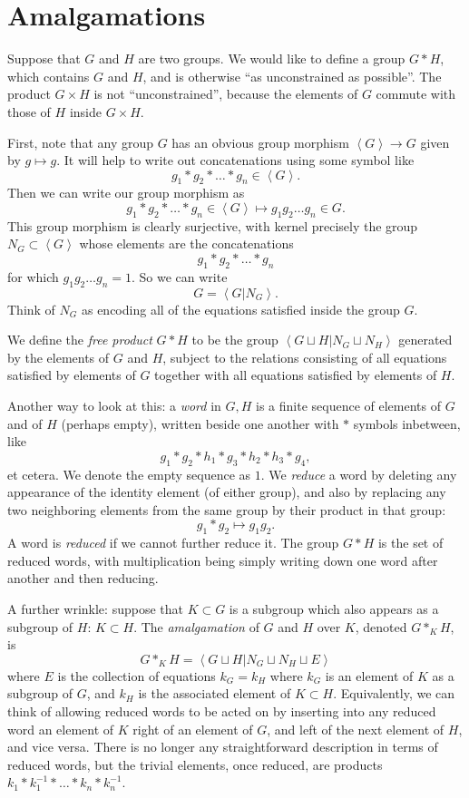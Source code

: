 \section{Amalgamations}
Suppose that \(G\) and \(H\) are two groups.
We would like to define a group \(G*H\), which contains \(G\) and \(H\), and is otherwise ``as unconstrained as possible''.
The product \(G \times H\) is not ``unconstrained'', because the elements of \(G\) commute with those of \(H\) inside \(G \times H\).

First, note that any group \(G\) has an obvious group morphism \(\left<G\right> \to G\) given by \(g \mapsto g\).
It will help to write out concatenations using some symbol like
\[
g_1 * g_2 * \dots * g_n \in \left<G\right>.
\]
Then we can write our group morphism as
\[
g_1 * g_2 * \dots * g_n \in \left<G\right> \mapsto g_1 g_2 \dots g_n \in G.
\]
This group morphism is clearly surjective, with kernel precisely the group \(N_G \subset \left<G\right>\) whose elements are the concatenations
\[
g_1 * g_2 * \dots * g_n
\]
for which \(g_1 g_2 \dots g_n=1\).
So we can write
\[
G=\left<G|N_G\right>.
\]
Think of \(N_G\) as encoding all of the equations satisfied inside the group \(G\).

We define the \emph{free product} \(G*H\) to be the group \(\left<G \sqcup H|N_G \sqcup N_H\right>\) generated by the elements of \(G\) and \(H\), subject to the relations consisting of all equations satisfied by elements of \(G\) together with all equations satisfied by elements of \(H\).

Another way to look at this: a \emph{word} in \(G,H\) is a finite sequence of elements of \(G\) and of \(H\) (perhaps empty), written beside one another with \(*\) symbols inbetween, like
\[
g_1 * g_2 * h_1 * g_3 * h_2 * h_3 * g_4,
\]
et cetera.
We denote the empty sequence as \(1\).
We \emph{reduce} a word by deleting any appearance of the identity element (of either group), and also by replacing any two neighboring elements from the same group by their product in that group:
\[
g_1 * g_2 \mapsto g_1 g_2.
\]
A word is \emph{reduced} if we cannot further reduce it.
The group \(G*H\) is the set of reduced words, with multiplication being simply writing down one word after another and then reducing.

A further wrinkle: suppose that \(K \subset G\) is a subgroup which also appears as a subgroup of \(H\): \(K \subset H\).
The \emph{amalgamation} of \(G\) and \(H\) over \(K\), denoted \(G*_K H\), is
\[
G *_K H = \left<G \sqcup H|N_G \sqcup N_H \sqcup E\right>
\]
where \(E\) is the collection of equations \(k_G=k_H\) where \(k_G\) is an element of \(K\) as a subgroup of \(G\), and \(k_H\) is the associated element of \(K \subset H\).
Equivalently, we can think of allowing reduced words to be acted on by inserting into any reduced word an element of \(K\) right of an element of \(G\), and left of the next element of \(H\), and vice versa.
There is no longer any straightforward description in terms of reduced words, but the trivial elements, once reduced, are products \(k_1 * k_1^{-1} * \dots * k_n * k_n^{-1}\).


